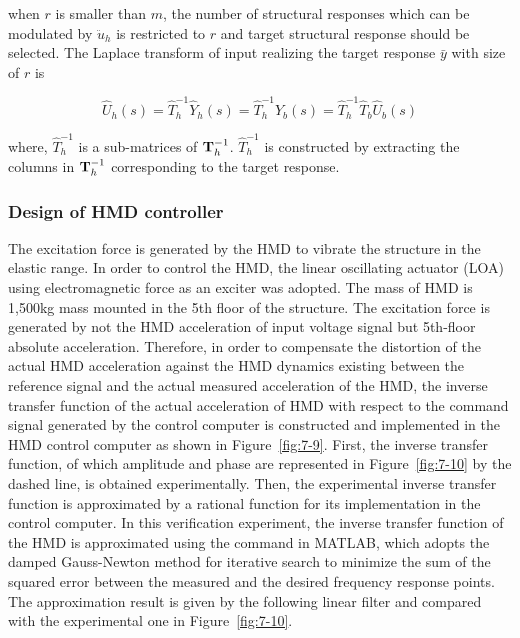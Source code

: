 when $r$ is smaller than $m$, the number of structural responses which can be modulated by $\ddot{u}_{h}$ is restricted to $r$ and target structural response should be selected. The Laplace transform of input realizing the target response $\bar{y}$ with size of $r$ is

\begin{equation}\label{eq:7-14}
\hat{U}_{h}(s) = \hat{T}_{h}^{-1}\hat{Y}_{h}(s) = \hat{T}_{h}^{-1}\hat{Y}_{b}(s) = \hat{T}_{h}^{-1}\hat{T}_{b}\hat{U}_{b}(s)
\end{equation}

where, $\hat{T}_{h}^{-1}$ is a sub-matrices of $\mathbf{T}_{h}^{-1}$. $\hat{T}_{h}^{-1}$ is constructed by extracting the columns in $\mathbf{T}_{h}^{-1}$ corresponding to the target response.

\subsubsection{Design of HMD controller}\label{sec:7-5-2}
The excitation force is generated by the HMD to vibrate the structure in the elastic range. In order to control the HMD, the linear oscillating actuator (LOA) using electromagnetic force as an exciter was adopted. The mass of HMD is 1,500kg mass mounted in the 5th floor of the structure. The excitation force is generated by not the HMD acceleration of input voltage signal but 5th-floor absolute acceleration. Therefore, in order to compensate the distortion of the actual HMD acceleration against the HMD dynamics existing between the reference signal and the actual measured acceleration of the HMD, the inverse transfer function of the actual acceleration of HMD with respect to the command signal generated by the control computer is constructed and implemented in the HMD control computer as shown in Figure~\ref{fig:7-9}. First, the inverse transfer function, of which amplitude and phase are represented in Figure~\ref{fig:7-10} by the dashed line, is obtained experimentally. Then, the experimental inverse transfer function is approximated by a rational function for its implementation in the control computer. In this verification experiment, the inverse transfer function of the HMD is approximated using the command  in MATLAB\citep{coleman1999optimization}, which adopts the damped Gauss-Newton method for iterative search to minimize the sum of the squared error between the measured and the desired frequency response points\citep{dennis1983numerical}. The approximation result is given by the following linear filter and compared with the experimental one in Figure~\ref{fig:7-10}.

